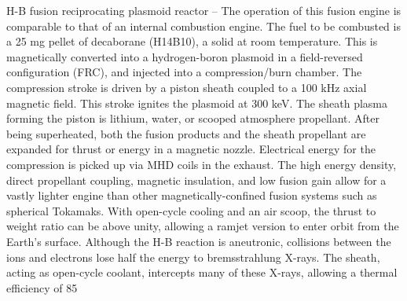 \documentclass[a4paper]{book}
\begin{document}
H-B fusion reciprocating plasmoid reactor – The operation of this fusion engine is comparable to that of an internal combustion engine. The fuel to be combusted is a 25 mg pellet of decaborane (H14B10), a solid at room temperature. This is magnetically converted into a hydrogen-boron plasmoid in a field-reversed configuration (FRC), and injected into a compression/burn chamber. The compression stroke is driven by a piston sheath coupled to a 100 kHz axial magnetic field. This stroke ignites the plasmoid at 300 keV. The sheath plasma forming the piston is lithium, water, or scooped atmosphere propellant. After being superheated, both the fusion products and the sheath propellant are expanded for thrust or energy in a magnetic nozzle. Electrical energy for the compression is picked up via MHD coils in the exhaust. The high energy density, direct propellant coupling, magnetic insulation, and low fusion gain allow for a vastly lighter engine than other magnetically-confined fusion systems such as spherical Tokamaks. With open-cycle cooling and an air scoop, the thrust to weight ratio can be above unity, allowing a ramjet version to enter orbit from the Earth’s surface. Although the H-B reaction is aneutronic, collisions between the ions and electrons lose half the energy to bremsstrahlung X-rays. The sheath, acting as open-cycle coolant, intercepts many of these X-rays, allowing a thermal efficiency of 85%
 
\end{document}
